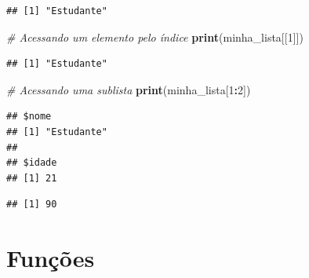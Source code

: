 \documentclass[
]{book}
\newenvironment{Shaded}{\begin{snugshade}}{\end{snugshade}}
\newcommand{\CommentTok}[1]{\textcolor[rgb]{0.56,0.35,0.01}{\textit{#1}}}
\newcommand{\DecValTok}[1]{\textcolor[rgb]{0.00,0.00,0.81}{#1}}
\newcommand{\FunctionTok}[1]{\textcolor[rgb]{0.13,0.29,0.53}{\textbf{#1}}}
\newcommand{\NormalTok}[1]{#1}
\newcommand{\SpecialCharTok}[1]{\textcolor[rgb]{0.81,0.36,0.00}{\textbf{#1}}}
\theoremstyle{definition}
\theoremstyle{definition}
\theoremstyle{definition}
\theoremstyle{definition}
\theoremstyle{remark}
\begin{document}
\begin{Shaded}
\end{Shaded}

\begin{verbatim}
## [1] "Estudante"
\end{verbatim}

\begin{Shaded}
\begin{Highlighting}[]
\CommentTok{\# Acessando um elemento pelo índice}
\FunctionTok{print}\NormalTok{(minha\_lista[[}\DecValTok{1}\NormalTok{]])}
\end{Highlighting}
\end{Shaded}

\begin{verbatim}
## [1] "Estudante"
\end{verbatim}

\begin{Shaded}
\begin{Highlighting}[]
\CommentTok{\# Acessando uma sublista}
\FunctionTok{print}\NormalTok{(minha\_lista[}\DecValTok{1}\SpecialCharTok{:}\DecValTok{2}\NormalTok{])}
\end{Highlighting}
\end{Shaded}

\begin{verbatim}
## $nome
## [1] "Estudante"
## 
## $idade
## [1] 21
\end{verbatim}

\begin{Shaded}
\end{Shaded}

\begin{verbatim}
## [1] 90
\end{verbatim}

\chapter{Funções}\label{funuxe7uxf5es}
\end{document}
